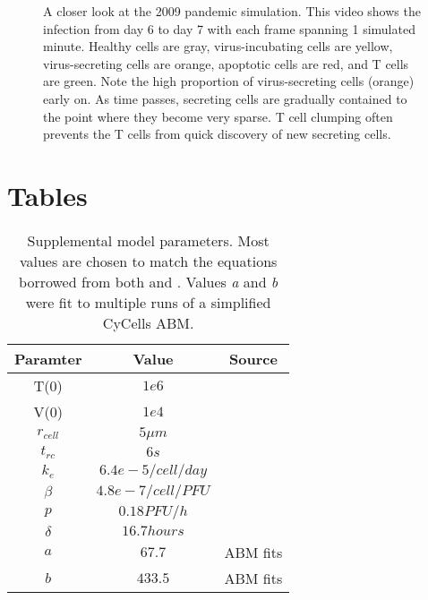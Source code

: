 \documentclass[10pt]{article}
\begin{document}
\begin{figure}[ht!]
\caption{A closer look at the 2009 pandemic simulation.  This video shows the infection from day 6 to day 7 with each frame spanning 1 simulated minute.  Healthy cells are gray, virus-incubating cells are yellow, virus-secreting cells are orange, apoptotic cells are red, and T cells are green.  Note the high proportion of virus-secreting cells (orange) early on.  As time passes, secreting cells are gradually contained to the point where they become very sparse.  T cell clumping often prevents the T cells from quick discovery of new secreting cells.}
\end{figure}

\pagebreak

\section*{Tables}



\renewcommand{\thetable}{S\arabic{table}}

\begin{table}[!ht]
\begin{center}
\begin{tabular}{ | c | c | c | }
  \hline                        
  Paramter & Value & Source \\
  \hline
  T(0) & $1e6$ & \cite{Mitchell2011} \\
  V(0) &  $1e4$ & \cite{Mitchell2011} \\
  $r_{cell}$ &  $5 \mu m$ & \cite{Miao2010} \\
  $t_{rc}$ & $6s$ & \cite{Peters1983} \\
  $k_e$ & $6.4e-5/cell/day$ & \cite{Miao2010} \\
  $\beta$ & $4.8e-7/cell/PFU$ & \cite{Mitchell2011} \\
  $p$ & $0.18 PFU/h$ & \cite{Mitchell2011} \\
  $\delta$ & $16.7 hours$ & \cite{Mitchell2011} \\
  $a$ & $67.7$ & ABM fits \\
  $b$ & $433.5$ & ABM fits \\
  \hline  
\end{tabular}
\caption{Supplemental model parameters.  Most values are chosen to match the equations borrowed from both \cite{Mitchell2011} and \cite{Miao2010}.  Values \textit{a} and \textit{b} were fit to multiple runs of a simplified CyCells ABM.}
\label{table:supplement}
\end{center}
\end{table}
\end{document}

